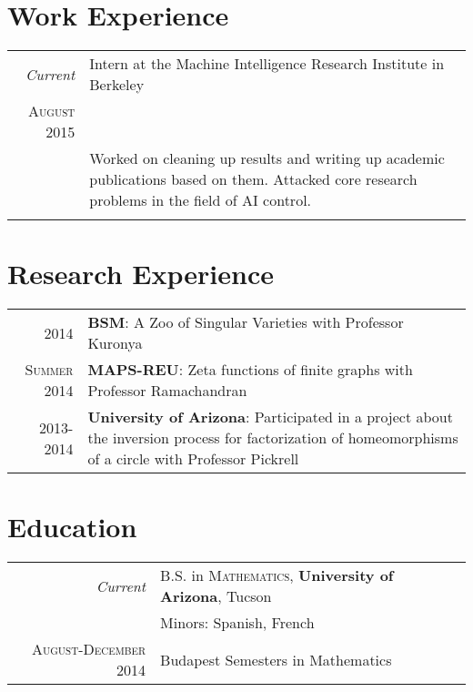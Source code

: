 \documentclass[a4paper,10pt]{article}
\begin{document}
\section{Work Experience}
\begin{tabular}{r|p{11cm}}
 \emph{Current} & Intern at the Machine Intelligence Research Institute in Berkeley \\\textsc{August 2015}\\&\footnotesize{Worked on cleaning up results and writing up academic publications based on them. Attacked core research problems in the field of AI control.}\\\multicolumn{2}{c}{} \\
\end{tabular}

\section{Research Experience}
\begin{tabular}{rp{10cm}}
	2014 & \textbf{BSM}: A Zoo of Singular Varieties with Professor Kuronya\\
	\textsc{Summer} 2014 & \textbf{MAPS-REU}: Zeta functions of finite graphs with Professor Ramachandran\\
	2013-2014& \textbf{University of Arizona}: Participated in a project about the inversion process for factorization of homeomorphisms of a circle with Professor Pickrell\\
\end{tabular}


\section{Education}
\begin{tabular}{rl}	
	\emph{Current} & B.S. in \textsc{Mathematics}, \textbf{University of Arizona}, Tucson\\
		& Minors: Spanish, French\\
	\textsc{August-December} 2014& Budapest Semesters in Mathematics \\
\end{tabular}
\end{document}

